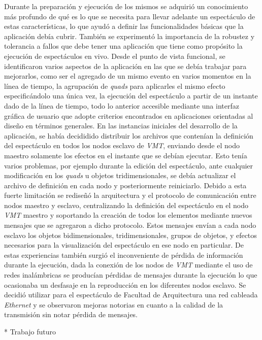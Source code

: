  Durante la preparación y ejecución de los mismos se adquirió un conocimiento más profundo de qué es lo que se necesita para llevar adelante un espectáculo de estas características, lo que ayudó a definir las funcionalidades básicas que la aplicación debía cubrir. También se experimentó la importancia de la robustez y tolerancia a fallos que debe tener una aplicación que tiene como propósito la ejecución de espectáculos en vivo.
Desde el punto de vista funcional, se identificaron varios aspectos de la aplicación en las que se debía trabajar para mejorarlos, como ser el agregado de un mismo evento en varios momentos en la línea de tiempo, la agrupación de \emph{quads} para aplicarles el mismo efecto especificándolo una única vez, la ejecución del espectáculo a partir de un instante dado de la línea de tiempo, todo lo anterior accesible mediante una interfaz gráfica de usuario que adopte criterios encontrados en aplicaciones orientadas al diseño en términos generales.
En las instancias iniciales del desarrollo de la aplicación, se había decididido distribuir los archivos que contenían la definición del espectáculo en todos los nodos esclavo de \emph{VMT}, enviando desde el nodo maestro solamente los efectos en el instante que se debían ejecutar. Esto tenía varios problemas, por ejemplo durante la edición del espectáculo, ante cualquier modificación en los \emph{quads} u objetos tridimensionales, se debía actualizar el archivo de definición en cada nodo y posteriormente reiniciarlo.
Debido a esta fuerte limitación se rediseñó la arquitectura y el protocolo de comunicación entre nodos maestro y esclavo, centralizando la definición del espectáculo en el nodo \emph{VMT} maestro y soportando la creación de todos los elementos mediante nuevos mensajes que se agregaron a dicho protocolo. Estos mensajes envían a cada nodo esclavo los objetos bidimensionales, tridimensionales, grupos de objetos, y efectos necesarios para la visualización del espectáculo en ese nodo en particular.
De estas experiencias también surgió el inconveniente de pérdida de información durante la ejecución, dada la conexión de los nodos de \emph{VMT} mediante el uso de redes inalámbricas se producían pérdidas de mensajes durante la ejecución lo que ocasionaba un desfasaje en la reproducción en los diferentes nodos esclavo. Se decidió utilizar para el espectáculo de Facultad de Arquitectura una red cableada \emph{Ethernet} y se observaron mejoras notorias en cuanto a la calidad de la transmisión sin notar pérdida de mensajes.

* Trabajo futuro

